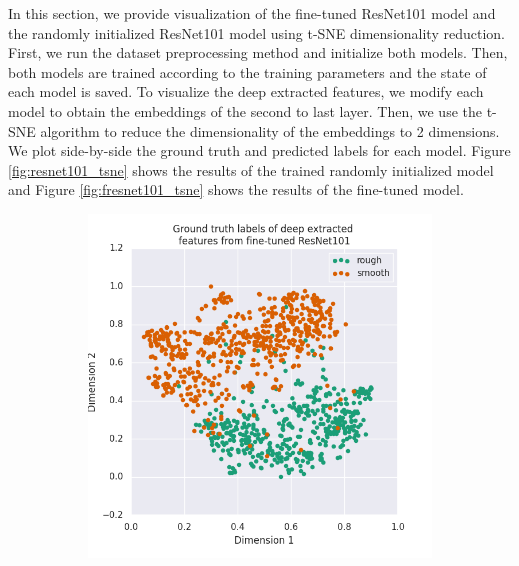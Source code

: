\documentclass[12pt]{article}
\begin{document}
In this section, we provide visualization of the fine-tuned ResNet101 model and
the randomly initialized ResNet101 model using t-SNE dimensionality reduction.
First, we run the dataset preprocessing method and initialize both models. Then,
both models are trained according to the training parameters and the state of
each model is saved. To visualize the deep extracted features, we modify each
model to obtain the embeddings of the second to last layer. Then, we use the
t-SNE algorithm to reduce the dimensionality of the embeddings to 2 dimensions.
We plot side-by-side the ground truth and predicted labels for each model.
Figure \ref{fig:resnet101_tsne} shows the results of the trained randomly
initialized model and Figure \ref{fig:fresnet101_tsne} shows the results of the
fine-tuned model.

\begin{figure}[h]
    \centering
    \begin{subfigure}{.45\textwidth}
        \includegraphics[width=1\linewidth]{assets/plots/fresnet101_gt_tsne.png}
    \end{subfigure}
    \begin{subfigure}{.45\textwidth}

\end{subfigure}
\end{figure}
\end{document}
